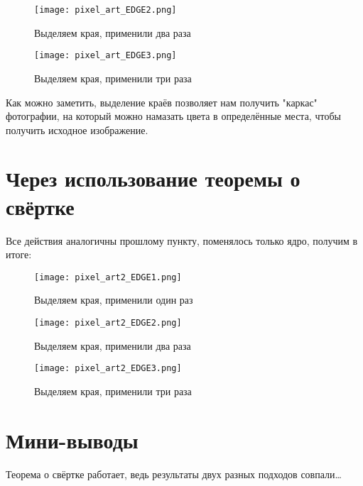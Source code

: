 \begin{figure}[ht]
    \centering
    \texttt{[image: pixel\_art\_EDGE2.png]}
	\caption{Выделяем края, применили два раза}
\end{figure}


\begin{figure}[ht]
    \centering
    \texttt{[image: pixel\_art\_EDGE3.png]}
	\caption{Выделяем края, применили три раза}
\end{figure}

Как можно заметить,  выделение краёв позволяет нам получить "каркас" фотографии, на который можно намазать цвета в определённые места, 
чтобы получить исходное изображение.

\newpage
\section{Через использование теоремы о свёртке}
Все действия аналогичны прошлому пункту, поменялось только ядро, получим в итоге:

\begin{figure}[ht]
    \centering
    \texttt{[image: pixel\_art2\_EDGE1.png]}
	\caption{Выделяем края, применили один раз}
\end{figure}



\begin{figure}[ht]
    \centering
    \texttt{[image: pixel\_art2\_EDGE2.png]}
	\caption{Выделяем края, применили два раза}
\end{figure}


\begin{figure}[ht]
    \centering
    \texttt{[image: pixel\_art2\_EDGE3.png]}
	\caption{Выделяем края, применили три раза}
\end{figure}

\section{Мини-выводы}
Теорема о свёртке работает, ведь результаты двух разных подходов совпали\dots



\endinput